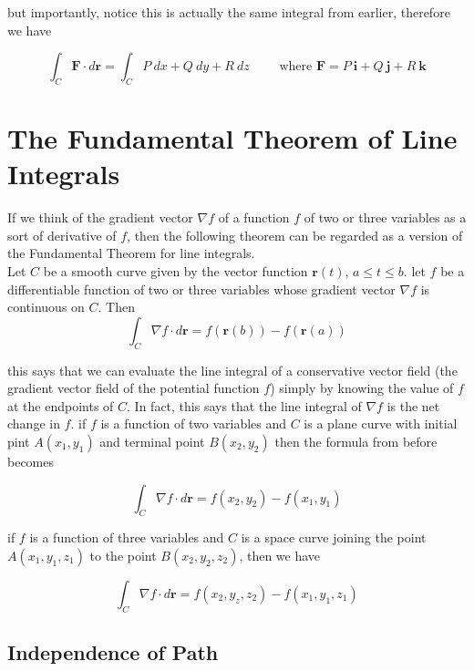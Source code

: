 \documentclass{article}
\begin{document}
but importantly, notice this is actually the same integral from earlier, therefore we have 

\begin{equation*}
    \int_C \mathbf{F} \cdot d \mathbf{r} = \int_C P \ dx + Q \ dy + R \ dz \qquad \text{ where $\mathbf{F} = P  \ \mathbf{i} + Q \ \mathbf{j} + R \ \mathbf{k}$}
\end{equation*}

\newpage
\section{The Fundamental Theorem of Line Integrals}

If we think of the gradient vector $\nabla f$ of a function $f$ of two or three variables as a sort of derivative of $f$, then the following theorem can be regarded as a version of the Fundamental Theorem for line integrals. 
\\

Let $C$ be a smooth curve given by the vector function $\mathbf{r}(t)$, $a \leq t \leq b$. let $f$ be a differentiable function of two or three variables whose gradient vector $\nabla f$ is continuous on $C$. Then
\begin{equation*}
    \int_C \nabla f \cdot d \mathbf{r} = f(\mathbf{r}(b)) - f(\mathbf{r}(a))
\end{equation*}

this says that we can evaluate the line integral of a conservative vector field (the gradient vector field of the potential function $f$) simply by knowing the value of $f$ at the endpoints of $C$. In fact, this says that the line integral of $\nabla f$ is the net change in $f$. if $f$ is a function of two variables and $C$ is a plane curve with initial pint $A(x_1, y_1)$ and terminal point $B(x_2,y_2)$ then the formula from before becomes 

\begin{equation*}
    \int_C \nabla f \cdot d \mathbf{r} = f(x_2,y_2) - f(x_1, y_1)
\end{equation*}

if $f$ is a function of three variables and $C$ is a space curve joining the point $A(x_1, y_1, z_1)$ to the point $B(x_2, y_2, z_2)$, then we have

\begin{equation*}
    \int_C \nabla f \cdot d \mathbf{r} = f(x_2,y_z,z_2) - f(x_1, y_1, z_1)
\end{equation*}

\subsection{Independence of Path}
\end{document}
